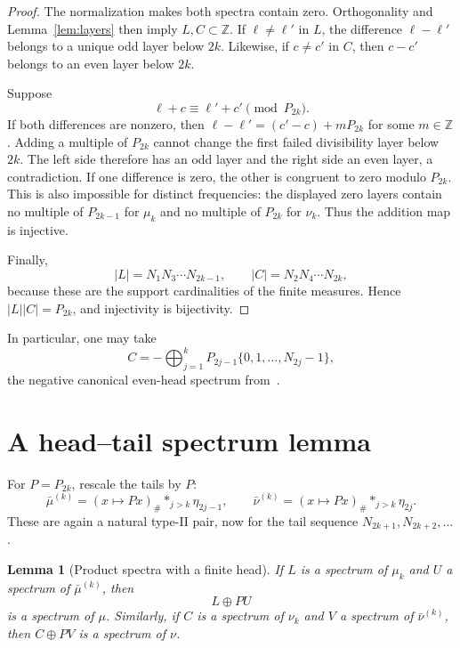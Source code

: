 \documentclass[11pt]{article}
\newtheorem{lemma}[theorem]{Lemma}
\newcommand{\Z}{\mathbb Z}
\begin{document}
\begin{proof}
The normalization makes both spectra contain zero.  Orthogonality and
Lemma~\ref{lem:layers} then imply $L,C\subset\Z$.  If $\ell\neq\ell'$ in
$L$, the difference $\ell-\ell'$ belongs to a unique odd layer below $2k$.
Likewise, if $c\neq c'$ in $C$, then $c-c'$ belongs to an even layer below
$2k$.

Suppose
\[
 \ell+c\equiv\ell'+c'\pmod{P_{2k}}.
\]
If both differences are nonzero, then
$\ell-\ell'=(c'-c)+mP_{2k}$ for some $m\in\Z$.  Adding a multiple of
$P_{2k}$ cannot change the first failed divisibility layer below $2k$.
The left side therefore has an odd layer and the right side an even layer, a
contradiction.  If one difference is zero, the other is congruent to zero
modulo $P_{2k}$.  This is also impossible for distinct frequencies: the
displayed zero layers contain no multiple of $P_{2k-1}$ for $\mu_k$ and no
multiple of $P_{2k}$ for $\nu_k$.  Thus the addition map is injective.

Finally,
\[
 |L|=N_1N_3\cdots N_{2k-1},\qquad
 |C|=N_2N_4\cdots N_{2k},
\]
because these are the support cardinalities of the finite measures.  Hence
$|L||C|=P_{2k}$, and injectivity is bijectivity.
\end{proof}

In particular, one may take
\[
 C=-\bigoplus_{j=1}^k
 P_{2j-1}\{0,1,\ldots,N_{2j}-1\},
\]
the negative canonical even-head spectrum from~\cite{GabardoLai}.

\section{A head--tail spectrum lemma}

For $P=P_{2k}$, rescale the tails by $P$:
\[
 \bar\mu^{(k)}=(x\mapsto Px)_\#
    \mathop{*}_{j>k}\eta_{2j-1},
 \qquad
 \bar\nu^{(k)}=(x\mapsto Px)_\#
    \mathop{*}_{j>k}\eta_{2j}.
\]
These are again a natural type-II pair, now for the tail sequence
$N_{2k+1},N_{2k+2},\ldots$.

\begin{lemma}[Product spectra with a finite head]\label{lem:product}
If $L$ is a spectrum of $\mu_k$ and $U$ a spectrum of $\bar\mu^{(k)}$, then
\[
 L\oplus P U
\]
is a spectrum of $\mu$.  Similarly, if $C$ is a spectrum of $\nu_k$ and $V$
a spectrum of $\bar\nu^{(k)}$, then $C\oplus PV$ is a spectrum of $\nu$.
\end{lemma}
\end{document}
